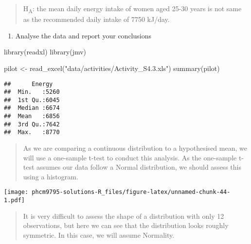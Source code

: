 \documentclass[
]{memoir}
\newenvironment{Shaded}{\begin{snugshade}}{\end{snugshade}}
\newcommand{\AttributeTok}[1]{\textcolor[rgb]{0.77,0.63,0.00}{#1}}
\newcommand{\FunctionTok}[1]{\textcolor[rgb]{0.00,0.00,0.00}{#1}}
\newcommand{\NormalTok}[1]{#1}
\newcommand{\OtherTok}[1]{\textcolor[rgb]{0.56,0.35,0.01}{#1}}
\newcommand{\SpecialCharTok}[1]{\textcolor[rgb]{0.00,0.00,0.00}{#1}}
\newcommand{\StringTok}[1]{\textcolor[rgb]{0.31,0.60,0.02}{#1}}
\providecommand{\tightlist}{%
  \setlength{\itemsep}{0pt}\setlength{\parskip}{0pt}}
\begin{document}
\begin{quote}
H\textsubscript{A}: the mean daily energy intake of women aged 25-30 years is not same as the recommended daily intake of 7750 kJ/day.
\end{quote}

\begin{enumerate}
\def\labelenumi{\alph{enumi})}
\setcounter{enumi}{3}
\tightlist
\item
  Analyse the data and report your conclusions
\end{enumerate}

\begin{Shaded}
\begin{Highlighting}[]
\FunctionTok{library}\NormalTok{(readxl)}
\FunctionTok{library}\NormalTok{(jmv)}

\NormalTok{pilot }\OtherTok{\textless{}{-}} \FunctionTok{read\_excel}\NormalTok{(}\StringTok{"data/activities/Activity\_S4.3.xls"}\NormalTok{)}
\FunctionTok{summary}\NormalTok{(pilot)}
\end{Highlighting}
\end{Shaded}

\begin{verbatim}
##      Energy    
##  Min.   :5260  
##  1st Qu.:6045  
##  Median :6674  
##  Mean   :6856  
##  3rd Qu.:7642  
##  Max.   :8770
\end{verbatim}

\begin{quote}
As we are comparing a continuous distribution to a hypothesised mean, we will use a one-sample t-test to conduct this analysis. As the one-sample t-test assumes our data follow a Normal distribution, we should assess this using a histogram.
\end{quote}

\begin{Shaded}
\end{Shaded}

\texttt{[image: phcm9795-solutions-R\_files/figure-latex/unnamed-chunk-44-1.pdf]}

\begin{quote}
It is very difficult to assess the shape of a distribution with only 12 observations, but here we can see that the distribution looks roughly symmetric. In this case, we will assume Normality.
\end{quote}
\end{document}
